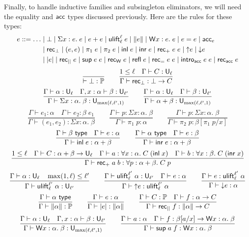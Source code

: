 Finally, to handle inductive families and subsingleton eliminators, we will need the equality and $\mathsf{acc}$ types discussed previously. Here are the rules for these types:
\begin{align*}
e::=\dots&\mid\bot\mid\Sigma x:e.\;e\mid e+e\mid \ulift_{\ell}^{\ell}\;e\mid \|e\|\mid \mathsf{W} x:e.\;e\mid e=e\mid \acc_e\\
&\mid\rec_\bot\mid(e,e)\mid\pi_1\;e\mid\pi_2\;e\mid \inl e\mid \inr e\mid \rec_+\;e\;e\mid {\uparrow}e\mid {\downarrow}e\\
&\mid |e|\mid\rec_{||}\;e\mid\sup e\;e\mid\rec_\W\;e\mid \refl\;e\mid \rec_=\;e\;e\mid \intro_\acc\;e\;e\mid\rec_\acc\;e
\end{align*}
$$\frac{}{\vdash \bot:\P}\qquad
\frac{1\le\ell\quad \Gamma\vdash C:\U_\ell}{\Gamma\vdash \rec_\bot:\bot\to C}$$
$$\frac{\Gamma\vdash \alpha:\U_\ell\quad \Gamma,x:\alpha\vdash \beta:\U_{\ell'}}
{\Gamma\vdash \Sigma x:\alpha.\;\beta:\U_{\max(\ell,\ell',1)}}\qquad
\frac{\Gamma\vdash \alpha:\U_\ell\quad \Gamma\vdash \beta:\U_{\ell'}}
{\Gamma\vdash \alpha+\beta:\U_{\max(\ell,\ell',1)}}$$
$$\frac{\Gamma\vdash e_1:\alpha\quad \Gamma\vdash e_2:\beta\;e_1}
{\Gamma\vdash(e_1,e_2):\Sigma x:\alpha.\;\beta}\qquad
\frac{\Gamma\vdash p:\Sigma x:\alpha.\;\beta}{\Gamma\vdash \pi_1\;p:\alpha}\qquad
\frac{\Gamma\vdash p:\Sigma x:\alpha.\;\beta}
{\Gamma\vdash \pi_2\;p:\beta[\pi_1\;p/x]}$$
$$\frac{\Gamma\vdash \beta\type\quad \Gamma\vdash e:\alpha}{\Gamma\vdash \inl e:\alpha+\beta}\qquad
\frac{\Gamma\vdash \alpha\type\quad \Gamma\vdash e:\beta}{\Gamma\vdash \inr e:\alpha+\beta}$$
$$\frac{1\le\ell\quad \Gamma\vdash C:\alpha+\beta\to\U_\ell\quad \Gamma\vdash a:\forall x:\alpha.\;C\;(\inl x)\quad \Gamma\vdash b:\forall x:\beta.\;C\;(\inr x)}{\Gamma\vdash \rec_+\;a\;b:\forall p:\alpha+\beta.\;C\;p}$$
$$\frac{\Gamma\vdash \alpha:\U_\ell\quad \max(1,\ell)\le\ell'}
{\Gamma\vdash\ulift_{\ell}^{\ell'}\;\alpha:\U_{\ell'}}\qquad
\frac{\Gamma\vdash\ulift_{\ell}^{\ell'}\;\alpha:\U_{\ell'}\quad \Gamma\vdash e:\alpha}{\Gamma\vdash {\uparrow}e:\ulift_{\ell}^{\ell'}\;\alpha}\qquad
\frac{\Gamma\vdash e:\ulift_{\ell}^{\ell'}\;\alpha}{\Gamma\vdash {\downarrow}e:\alpha}$$
$$\frac{\Gamma\vdash \alpha\type}
{\Gamma\vdash\|\alpha\|:\P}\qquad
\frac{\Gamma\vdash e:\alpha}{\Gamma\vdash |e|:\|\alpha\|}\qquad
\frac{\Gamma\vdash C:\P\quad \Gamma\vdash f:\alpha\to C}{\Gamma\vdash \rec_{||}\;f:\|\alpha\|\to C}$$
$$\frac{\Gamma\vdash \alpha:\U_\ell\quad \Gamma,x:\alpha\vdash\beta:\U_{\ell'}}
{\Gamma\vdash\W x:\alpha.\;\beta:\U_{\max(\ell,\ell',1)}}\qquad
\frac{\Gamma\vdash a:\alpha\quad\Gamma\vdash f:\beta[a/x]\to \W x:\alpha.\;\beta}{\Gamma\vdash\sup a\;f:\W x:\alpha.\;\beta}$$
